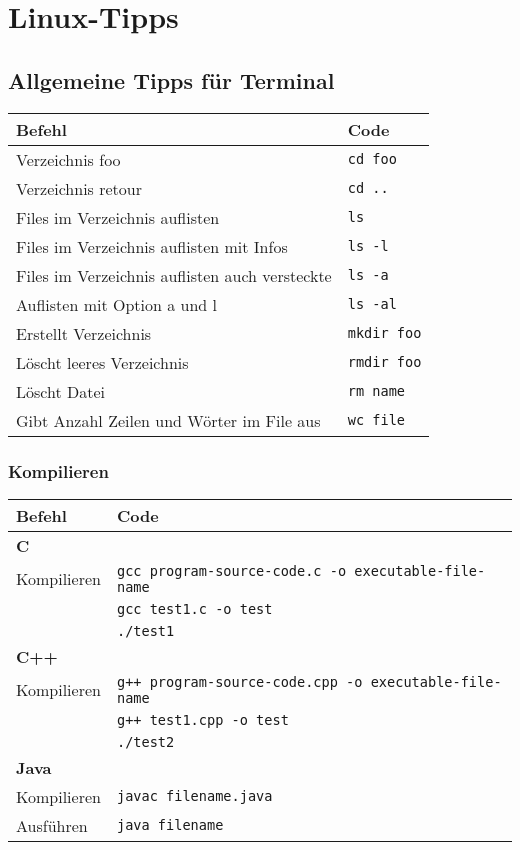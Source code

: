 \section{Linux-Tipps}
\subsection{Allgemeine Tipps für Terminal}
\begin{table}[H]
	\begin{tabular}{|p{}|p{}|}
		\hline
		\textbf{Befehl} & \textbf{Code}\\
		\hline
		Verzeichnis foo & \lstinline|cd foo|\\
		\hline
		Verzeichnis retour & \lstinline|cd ..|\\
		\hline
		Files im Verzeichnis auflisten & \lstinline|ls|\\
		\hline
		Files im Verzeichnis auflisten mit Infos & \lstinline|ls -l|\\
		\hline
		Files im Verzeichnis auflisten auch versteckte& \lstinline|ls -a|\\
		\hline
		Auflisten mit Option a und l & \lstinline|ls -al|\\
		\hline
		Erstellt Verzeichnis & \lstinline|mkdir foo|\\
		\hline
		Löscht leeres Verzeichnis& \lstinline|rmdir foo|\\
		\hline
		Löscht Datei & \lstinline|rm name|\\
		\hline
		Gibt Anzahl Zeilen und Wörter im File aus& \lstinline|wc file|\\
		\hline
	\end{tabular}
\end{table}
\subsubsection{Kompilieren}
\begin{table}[H]
	\noindent
	\begin{tabular}{|p{}|p{}|}
		\hline
		\textbf{Befehl} & \textbf{Code}\\
		\hline
		\textbf{C} & \\
		Kompilieren & \lstinline|gcc program-source-code.c -o executable-file-name|\\
		& \lstinline|gcc test1.c -o test|\\
		& \lstinline|./test1|\\
		\hline
		\textbf{C++} & \\
	    Kompilieren & \lstinline|g++ program-source-code.cpp -o executable-file-name|\\
		& \lstinline|g++ test1.cpp -o test|\\
		& \lstinline|./test2|\\
		\hline 
		\textbf{Java} & \\
		Kompilieren &
		\lstinline|javac filename.java|\\
		Ausführen & 
		\lstinline|java filename|\\
		\hline 
	\end{tabular}
\end{table}

\clearpage
\pagebreak
